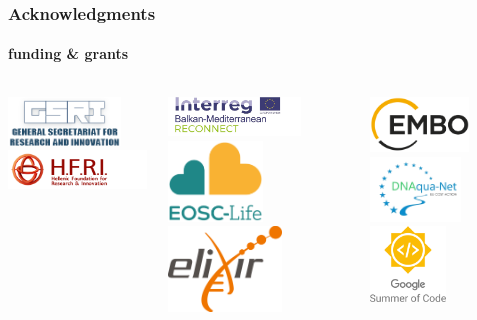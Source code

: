 \documentclass{beamer}
\begin{document}
   \begin{frame}
      \frametitle{Acknowledgments}
      \framesubtitle{funding \& grants}

      \begin{columns}[onlytextwidth]

            \includegraphics[width=30mm]{resources/thumbnail_gsri_logo_v2-en.png}
            \includegraphics[width=40mm]{resources/elidek_logo_en.png}
   
            \includegraphics[width=35mm]{resources/Acronym_Environment_RECONNECT_transp.png}
            \includegraphics[width=25mm]{resources/eosclogo.png}
            \includegraphics[width=30mm]{resources/Elixir-Europe-logo-1.png}

            \includegraphics[width=26mm]{resources/embo_logo.png}
            \includegraphics[width=24mm]{resources/dnaquanet_crop.png}
            \includegraphics[width=20mm]{resources/GSoC_logo.svg.png}

      \end{columns}

   \end{frame}
\end{document}
